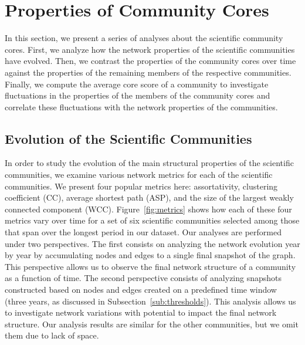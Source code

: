 \section{Properties of Community Cores}

In this section, we present a series of analyses about the scientific community cores. First, we analyze how the network properties of the scientific communities have evolved. 
Then, we contrast the properties of the community cores over time against the properties of the remaining members of the respective communities. 
Finally, we compute the average core score of a community to investigate fluctuations in the properties of the members of the community cores and 
correlate these fluctuations with the network properties of the communities.


\subsection{Evolution of the Scientific Communities}
\label{sub:time}

In order to study the evolution of the main structural properties of the scientific communities, we examine 
various network metrics for each of the scientific communities. We present four popular metrics here: assortativity, clustering coefficient (CC), average shortest path (ASP), 
and the size of the largest weakly connected component (WCC). Figure~\ref{fig:metrics} shows how each of these four metrics vary over time
for a set of six scientific communities selected among those that span over the longest period in our dataset.  Our analyses are performed under two perspectives. The first
consists on analyzing the network evolution year by year by accumulating nodes and edges to a single final snapshot of the graph. This perspective allows us to observe the final
network structure of a community as a function of time. The second perspective consists of analyzing snapshots constructed based on nodes and edges created on a predefined time
window (three years, as discussed in Subsection~\ref{sub:thresholds}). This analysis allows us to investigate network variations with potential to impact the final network structure.
Our analysis results are similar for the other communities, but we omit them due to lack of space.



